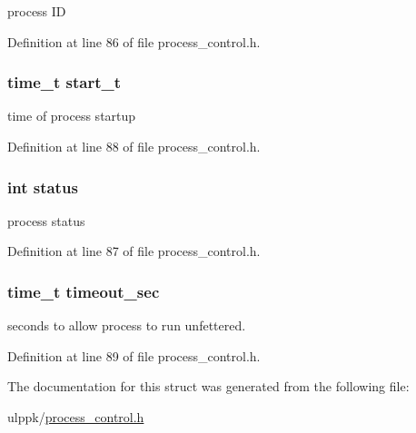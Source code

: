 process I\-D 



Definition at line 86 of file process\-\_\-control.\-h.

\hypertarget{struct_p_r_o_c___s_t_a_t_u_s_ae09a7ffbf8cce05233d3479437cefdeb}{
\subsubsection[{start\-\_\-t}]{\setlength{\rightskip}{0pt plus 5cm}time\-\_\-t start\-\_\-t}}\label{struct_p_r_o_c___s_t_a_t_u_s_ae09a7ffbf8cce05233d3479437cefdeb}


time of process startup 



Definition at line 88 of file process\-\_\-control.\-h.

\hypertarget{struct_p_r_o_c___s_t_a_t_u_s_a6e27f49150e9a14580fb313cc2777e00}{
\subsubsection[{status}]{\setlength{\rightskip}{0pt plus 5cm}int status}}\label{struct_p_r_o_c___s_t_a_t_u_s_a6e27f49150e9a14580fb313cc2777e00}


process status 



Definition at line 87 of file process\-\_\-control.\-h.

\hypertarget{struct_p_r_o_c___s_t_a_t_u_s_a6a3a80ada7b557528d0a80c9bf9af57a}{
\subsubsection[{timeout\-\_\-sec}]{\setlength{\rightskip}{0pt plus 5cm}time\-\_\-t timeout\-\_\-sec}}\label{struct_p_r_o_c___s_t_a_t_u_s_a6a3a80ada7b557528d0a80c9bf9af57a}


seconds to allow process to run unfettered. 



Definition at line 89 of file process\-\_\-control.\-h.



The documentation for this struct was generated from the following file\-:\begin{DoxyCompactItemize}
\item 
ulppk/\hyperlink{process__control_8h}{process\-\_\-control.\-h}\end{DoxyCompactItemize}

